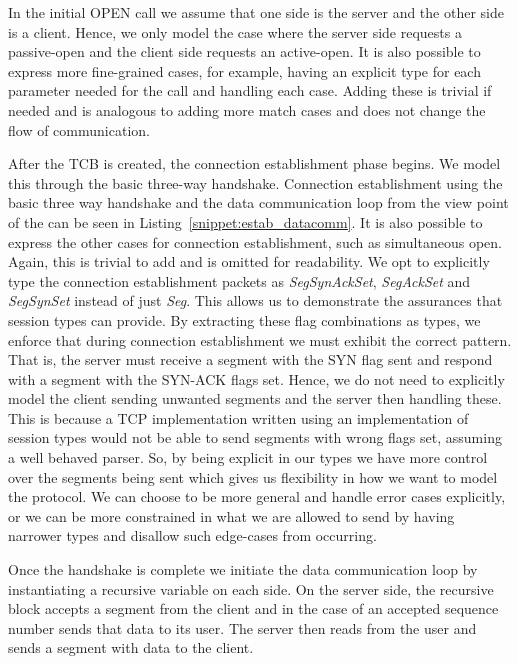 

In the initial OPEN call we assume that one side is the server and the other side is a client.
Hence, we only model the case where the server side requests a passive-open and the client side requests an active-open.
It is also possible to express more fine-grained cases, for example, having an explicit type for each parameter needed for the call and handling each case.
Adding these is trivial if needed and is analogous to adding more match cases and does not change the flow of communication.

After the TCB is created, the connection establishment phase begins.
We model this through the basic three-way handshake.
Connection establishment using the basic three way handshake and the data communication loop from the view point of the \serversystem can be seen in Listing~\ref{snippet:estab_datacomm}.
It is also possible to express the other cases for connection establishment, such as simultaneous open.
Again, this is trivial to add and is omitted for readability.
We opt to explicitly type the connection establishment packets as \textit{SegSynAckSet}, \textit{SegAckSet} and \textit{SegSynSet} instead of just \textit{Seg}.
This allows us to demonstrate the assurances that session types can provide.
By extracting these flag combinations as types, we enforce that during connection establishment we must exhibit the correct pattern.
That is, the server must receive a segment with the SYN flag sent and respond with a segment with the SYN-ACK flags set.
Hence, we do not need to explicitly model the client sending unwanted segments and the server then handling these.
This is because a TCP implementation written using an implementation of session types would not be able to send segments with wrong flags set, assuming a well behaved parser.
So, by being explicit in our types we have more control over the segments being sent which gives us flexibility in how we want to model the protocol.
We can choose to be more general and handle error cases explicitly, or we can be more constrained in what we are allowed to send by having narrower types and disallow such edge-cases from occurring.

Once the handshake is complete we initiate the data communication loop by instantiating a recursive variable on each side.
On the server side, the recursive block accepts a segment from the client and in the case of an accepted sequence number sends that data to its user.
The server then reads from the user and sends a segment with data to the client.

